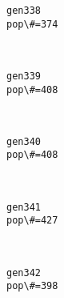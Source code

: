 \documentclass[11pt]{article}
\begin{document}
    \begin{Verbatim}[commandchars=\\\{\}]
gen338
pop\#=374

    \end{Verbatim}

    \begin{center}
    \end{center}
    { \hspace*{\fill} \\}
    
    \begin{Verbatim}[commandchars=\\\{\}]
gen339
pop\#=408

    \end{Verbatim}

    \begin{center}
    \end{center}
    { \hspace*{\fill} \\}
    
    \begin{Verbatim}[commandchars=\\\{\}]
gen340
pop\#=408

    \end{Verbatim}

    \begin{center}
    \end{center}
    { \hspace*{\fill} \\}
    
    \begin{Verbatim}[commandchars=\\\{\}]
gen341
pop\#=427

    \end{Verbatim}

    \begin{center}
    \end{center}
    { \hspace*{\fill} \\}
    
    \begin{Verbatim}[commandchars=\\\{\}]
gen342
pop\#=398

    \end{Verbatim}
\end{document}
